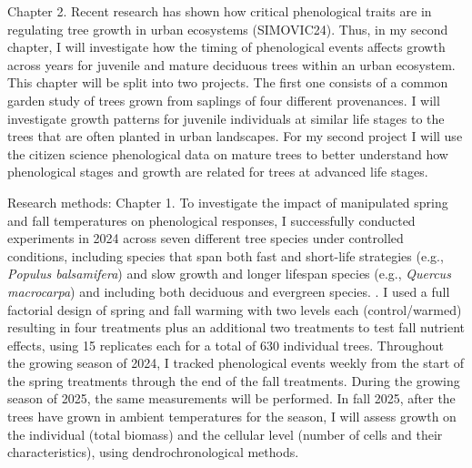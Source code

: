 \documentclass[11pt,letter]{article}
\begin{document}
Chapter 2. Recent research has shown how critical phenological traits are in regulating tree growth in urban ecosystems (SIMOVIC24). Thus, in my second chapter, I will investigate how the timing of phenological events affects growth across years for juvenile and mature deciduous trees within an urban ecosystem. This chapter will be split into two projects. The first one consists of a common garden study of trees grown from saplings of four different provenances. I will investigate growth patterns for juvenile individuals at similar life stages to the trees that are often planted in urban landscapes. For my second project I will use the citizen science phenological data on mature trees to better understand how phenological stages and growth are related for trees at advanced life stages. 
\par
Research methods: Chapter 1. To investigate the impact of manipulated spring and fall temperatures on phenological responses, I successfully conducted experiments in 2024 across seven different tree species under controlled conditions, including species that span both fast and short-life strategies (e.g., \textit{Populus balsamifera}) and slow growth and longer lifespan species (e.g., \textit{Quercus macrocarpa}) and including both deciduous and evergreen species. .\citep{jonsson_annual_2010}  I used a full factorial design of spring and fall warming with two levels each (control/warmed) resulting in four treatments plus an additional two treatments to test fall nutrient effects, using 15 replicates each for a total of 630 individual trees. Throughout the growing season of 2024, I tracked phenological events weekly from the start of the spring treatments through the end of the fall treatments. During the growing season of 2025, the same measurements will be performed. In fall 2025, after the trees have grown in ambient temperatures for the season, I will assess growth on the individual (total biomass) and the cellular level (number of cells and their characteristics), using dendrochronological methods.
\par
\end{document}
